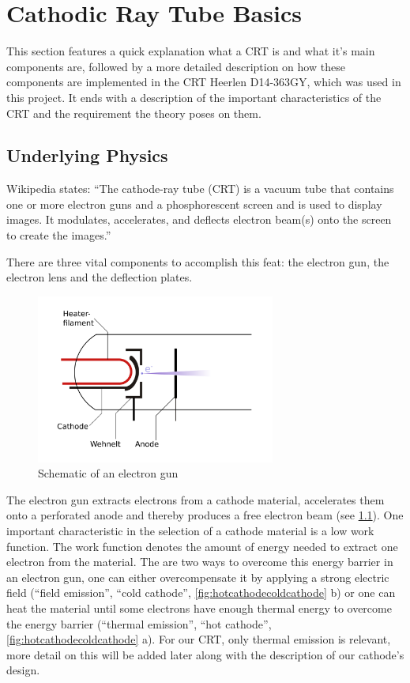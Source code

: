 
\chapter{Cathodic Ray Tube Basics}

This section features a quick explanation what a CRT is and what it's main components are, followed by a more detailed description on how these components are implemented in the CRT Heerlen D14-363GY, which was used in this project. It ends with a description of the important characteristics of the CRT and the requirement the theory poses on them.

\section{Underlying Physics}

Wikipedia states: ``The cathode-ray tube (CRT) is a vacuum tube that contains one or more electron guns and a phosphorescent screen and is used to display images. It modulates, accelerates, and deflects electron beam(s) onto the screen to create the images.''

There are three vital components to accomplish this feat: the electron gun, the electron lens and the deflection plates.

\begin{figure}
	\centering
	\includegraphics[width=0.7\textwidth]{Chapters/CRT-Basics/electron_gun}
	\caption{Schematic of an electron gun}
	\label{fig:electrongun}
\end{figure}


The electron gun extracts electrons from a cathode material, accelerates them onto a perforated anode and thereby produces a free electron beam (see \cref{fig:electrongun}). One important characteristic in the selection of a cathode material is a low work function. The work function denotes the amount of energy needed to extract one electron from the material. The are two ways to overcome this energy barrier in an electron gun, one can either overcompensate it by applying a strong electric field (``field emission'', ``cold cathode'', \cref{fig:hotcathodecoldcathode} b) or one can heat the material until some electrons have enough thermal energy to overcome the energy barrier (``thermal emission'', ``hot cathode'', \cref{fig:hotcathodecoldcathode} a). For our CRT, only thermal emission is relevant, more detail on this will be added later along with the description of our cathode's design. 

